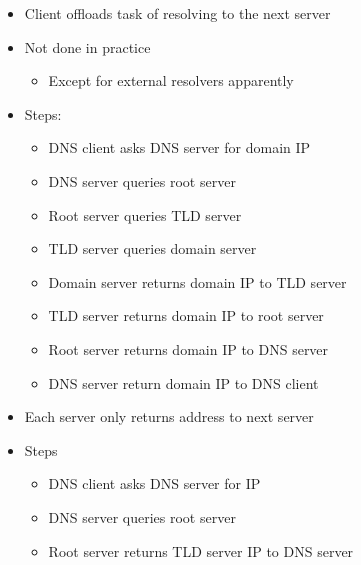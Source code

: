 \begin{itemize}
\begin{itemize}
        \end{itemize}
        \begin{itemize}
                \begin{itemize}
                    \item Client offloads task of resolving to the next server
                    \item Not done in practice
                        \begin{itemize}
                            \item Except for external resolvers apparently
                        \end{itemize}
                    \item Steps:
                        \begin{itemize}
                            \item DNS client asks DNS server for domain IP
                            \item DNS server queries root server
                            \item Root server queries TLD server
                            \item TLD server queries domain server
                            \item Domain server returns domain IP to TLD server
                            \item TLD server returns domain IP to root server
                            \item Root server returns domain IP to DNS server
                            \item DNS server return domain IP to DNS client
                        \end{itemize}
                \end{itemize}
                \begin{itemize}
                    \item Each server only returns address to next server
                    \item Steps
                        \begin{itemize}
                            \item DNS client asks DNS server for IP
                            \item DNS server queries root server
                            \item Root server returns TLD server IP to DNS server

\end{itemize}
\end{itemize}
\end{itemize}
\end{itemize}
